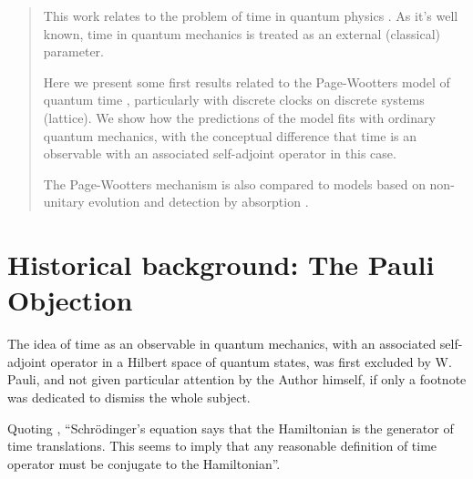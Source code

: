 \documentclass[a0,portrait]{a0poster}
\begin{document}
\begin{multicols}{2} %


\color{Navy} %

\begin{abstract}
\noindent %
This work relates to the problem of time in quantum physics \cite{TQM1, TQM2}.
As it's well known, time in quantum mechanics is treated as an external (classical) parameter.

Here we present some first results related to
the Page-Wootters model of quantum time \cite{Lloyd:Time, Maccone:Pauli},
particularly with discrete clocks on discrete systems (lattice).
We show how the predictions of the model fits with
ordinary quantum mechanics, with the conceptual difference that
time is an observable with an associated self-adjoint operator in this case.

The Page-Wootters mechanism is also compared to models based
on non-unitary evolution and detection by absorption \cite{RuschhauptAbsorption}.
\end{abstract}

\setlength{\parindent}{1.5em} %


\color{SaddleBrown} %

\section*{Historical background: The Pauli Objection}
The idea of time as an observable in quantum mechanics,
with an associated self-adjoint operator in a Hilbert space of quantum states,
was first excluded by W. Pauli,
and not given particular attention by the Author himself,
if only a footnote was dedicated to dismiss the whole subject. \cite{PauliFootnote}

Quoting \cite{Maccone:Pauli},
``Schr\"odinger's equation says that the Hamiltonian is the generator of time translations. This seems
to imply that any reasonable definition of time operator must be conjugate to the Hamiltonian''.
  

\end{multicols}
\end{document}
